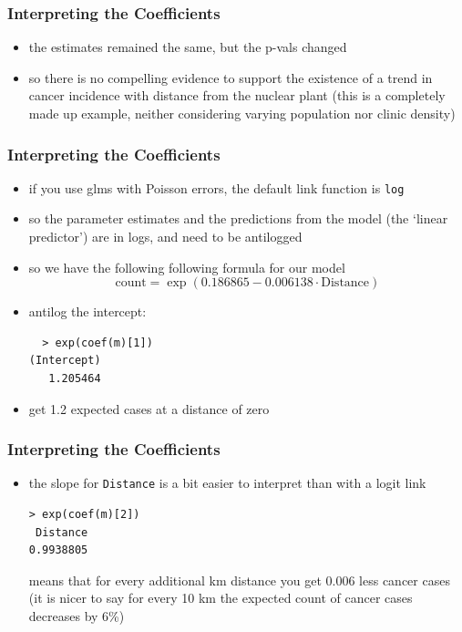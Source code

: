 \begin{frame}[fragile]\frametitle{Interpreting the Coefficients}
  \begin{itemize}
  \item the estimates remained the same, but the p-vals changed
  \item so there is no compelling evidence to support the existence of a trend in cancer incidence with distance
from the nuclear plant (this is a completely made up example, neither considering varying population nor clinic density)
  \end{itemize}
\end{frame}


\begin{frame}[fragile]\frametitle{Interpreting the Coefficients}
  \begin{itemize}
  \item if you use glms with Poisson errors, the default link function is \texttt{log}
  \item so the parameter estimates and the predictions from the model (the ‘linear predictor’) are in logs, and need to be antilogged
  \item so we have the following following formula for our model
$$\mbox{count}=\exp{(0.186865 - 0.006138 \cdot \mbox{Distance})}$$
  \item antilog the intercept:
\begin{verbatim}
  > exp(coef(m)[1])
(Intercept) 
   1.205464 
\end{verbatim}
\item get 1.2 expected cases at a distance of zero
  \end{itemize}
\end{frame}

\begin{frame}[fragile]\frametitle{Interpreting the Coefficients}
  \begin{itemize}
\item the slope for \texttt{Distance} is a bit easier to interpret than with a logit link
\begin{verbatim}
> exp(coef(m)[2])
 Distance 
0.9938805 
\end{verbatim}
means that for every additional km distance you get 0.006 less cancer cases  (it is nicer to say for every 10 km the expected count of cancer cases decreases by 6\%)
  \end{itemize}
\end{frame}

